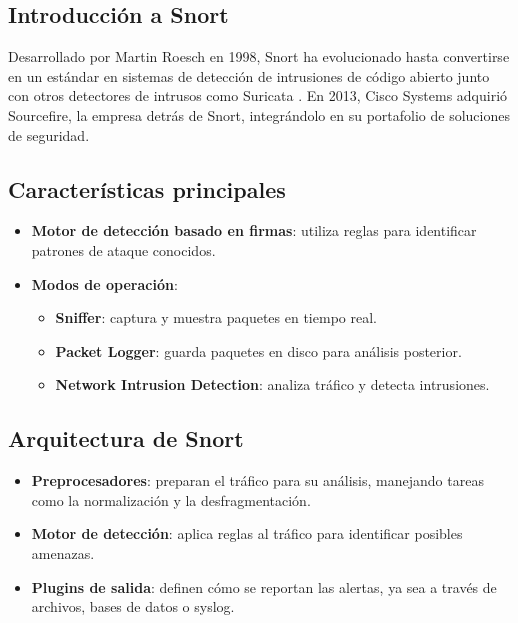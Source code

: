 \documentclass[12pt,a4paper]{report}
\begin{document}
\subsection{Introducción a Snort}

Desarrollado por Martin Roesch en 1998, Snort ha evolucionado hasta convertirse en un estándar en sistemas de detección de intrusiones de código abierto junto con otros detectores de intrusos como Suricata \cite{suricata_official}. En 2013, Cisco Systems adquirió Sourcefire, la empresa detrás de Snort, integrándolo en su portafolio de soluciones de seguridad.

\subsection{Características principales}

\begin{itemize}
    \item \textbf{Motor de detección basado en firmas}: utiliza reglas para identificar patrones de ataque conocidos.
    \item \textbf{Modos de operación}:
    \begin{itemize}
        \item \textbf{Sniffer}: captura y muestra paquetes en tiempo real.
        \item \textbf{Packet Logger}: guarda paquetes en disco para análisis posterior.
        \item \textbf{Network Intrusion Detection}: analiza tráfico y detecta intrusiones.
    \end{itemize}
\end{itemize}

\subsection{Arquitectura de Snort}

\begin{itemize}
    \item \textbf{Preprocesadores}: preparan el tráfico para su análisis, manejando tareas como la normalización y la desfragmentación.
    \item \textbf{Motor de detección}: aplica reglas al tráfico para identificar posibles amenazas.
    \item \textbf{Plugins de salida}: definen cómo se reportan las alertas, ya sea a través de archivos, bases de datos o syslog.
\end{itemize}
\end{document}
